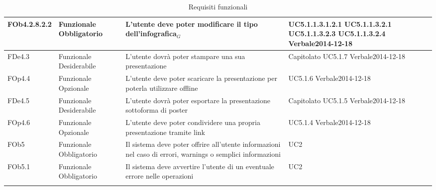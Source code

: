 \begin{longtable}{|l|p{2.5cm}|p{5cm}|p{3.5cm}|}
\hline
FOb4.2.8.2.2 & Funzionale \linebreak Obbligatorio & L'utente deve poter modificare il tipo dell'infografica$_G$ & UC5.1.1.3.1.2.1 \linebreak  UC5.1.1.3.2.1 \linebreak  UC5.1.1.3.2.3 \linebreak  UC5.1.1.3.2.4 \linebreak  Verbale2014-12-18 \linebreak  \\
\hline
FDe4.3 & Funzionale \linebreak Desiderabile & L'utente dovrà poter stampare una sua presentazione & Capitolato \linebreak  UC5.1.7 \linebreak  Verbale2014-12-18 \linebreak  \\
\hline
FOp4.4 & Funzionale \linebreak Opzionale & L'utente deve poter scaricare la presentazione per poterla utilizzare offline & UC5.1.6 \linebreak  Verbale2014-12-18 \linebreak  \\
\hline
FDe4.5 & Funzionale \linebreak Desiderabile & L'utente dovrà poter esportare la presentazione sottoforma di poster & Capitolato \linebreak  UC5.1.5 \linebreak  Verbale2014-12-18 \linebreak  \\
\hline
FOp4.6 & Funzionale \linebreak Opzionale & L'utente deve poter condividere una propria presentazione tramite link & UC5.1.4 \linebreak  Verbale2014-12-18 \linebreak  \\
\hline
FOb5 & Funzionale \linebreak Obbligatorio & Il sistema deve poter offrire all'utente informazioni nel caso di errori, warnings o semplici informazioni & UC2 \linebreak \\
\hline
FOb5.1 & Funzionale \linebreak Obbligatorio & Il sistema deve avvertire l'utente di un eventuale errore nelle operazioni & UC2 \linebreak  \\
\hline
\caption{Requisiti funzionali}
\end{longtable}

